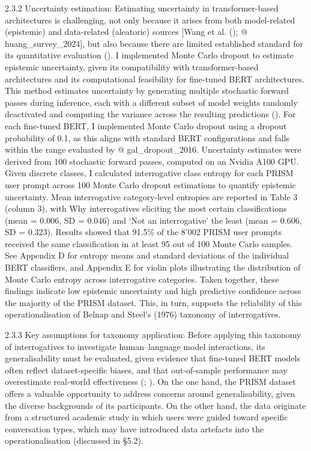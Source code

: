 \documentclass[
  12pt,
]{article}
\begin{document}
2.3.2 Uncertainty estimation:
Estimating uncertainty in transformer-based architectures is challenging, not only because it arises from both model-related (epistemic) and data-related (aleatoric) sources {[}Wang et al. (); @ huang\_survey\_2024{]}, but also because there are limited established standard for its quantitative evaluation (). I implemented Monte Carlo dropout to estimate epistemic uncertainty, given its compatibility with transformer-based architectures and its computational feasibility for fine-tuned BERT architectures. This method estimates uncertainty by generating multiple stochastic forward passes during inference, each with a different subset of model weights randomly deactivated and computing the variance across the resulting predictions (). For each fine-tuned BERT, I implemented Monte Carlo dropout using a dropout probability of 0.1, as this aligns with standard BERT configurations and falls within the range evaluated by @ gal\_dropout\_2016. Uncertainty estimates were derived from 100 stochastic forward passes, computed on an Nvidia A100 GPU. Given discrete classes, I calculated interrogative class entropy for each PRISM user prompt across 100 Monte Carlo dropout estimations to quantify epistemic uncertainty. Mean interrogative category-level entropies are reported in Table 3 (column 3), with Why interrogatives eliciting the most certain classifications (mean = 0.006, SD = 0.046) and `Not an interrogative' the least (mean = 0.606, SD = 0.323). Results showed that 91.5\% of the 8'002 PRISM user prompts received the same classification in at least 95 out of 100 Monte Carlo samples. See Appendix D for entropy means and standard deviations of the individual BERT classifiers, and Appendix E for violin plots illustrating the distribution of Monte Carlo entropy across interrogative categories. Taken together, these findings indicate low epistemic uncertainty and high predictive confidence across the majority of the PRISM dataset. This, in turn, supports the reliability of this operationalisation of Belnap and Steel's (1976) taxonomy of interrogatives.

2.3.3 Key assumptions for taxonomy application:
Before applying this taxonomy of interrogatives to investigate human--language model interactions, its generalisability must be evaluated, given evidence that fine-tuned BERT models often reflect dataset-specific biases, and that out-of-sample performance may overestimate real-world effectiveness (; ). On the one hand, the PRISM dataset offers a valuable opportunity to address concerns around generalisability, given the diverse backgrounds of its participants. On the other hand, the data originate from a structured academic study in which users were guided toward specific conversation types, which may have introduced data artefacts into the operationalisation (discussed in §5.2).
\end{document}
